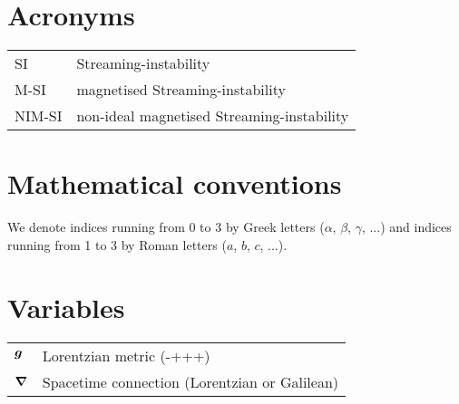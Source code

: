 \section*{Acronyms}

\begin{tabular}{ll}
    SI		& Streaming-instability \\
    M-SI	& magnetised Streaming-instability\\
    NIM-SI	& non-ideal magnetised Streaming-instability\\
\end{tabular}

\section*{Mathematical conventions}
\label{sec::Notation}


We denote indices running from 0 to 3 by Greek letters ($\alpha$, $\beta$, $\gamma$, ...) and indices running from 1 to 3 by Roman letters ($a$, $b$, $c$, ...).

\section*{Variables}

\begin{tabular}{ll}
    $\boldsymbol{g}$				& Lorentzian metric (-+++) \\
    $\boldsymbol{\nabla}$			& Spacetime connection (Lorentzian or Galilean)
\end{tabular}
